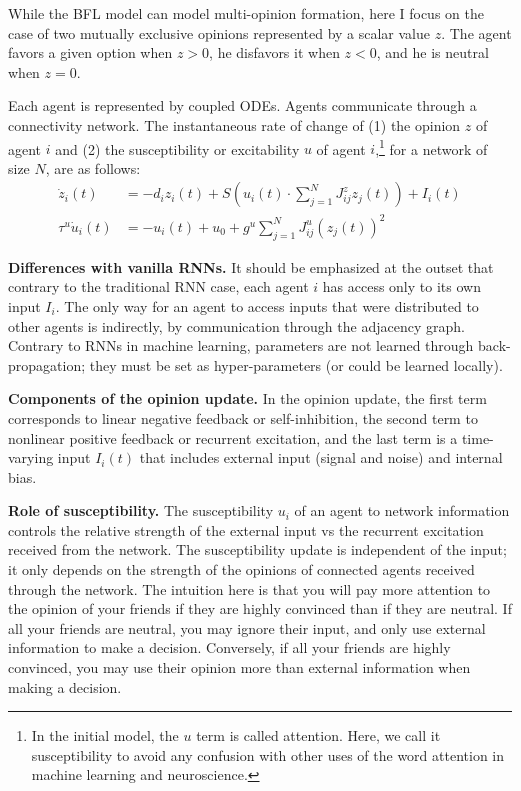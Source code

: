 \documentclass[]{article}
\begin{document}
While the BFL model can model multi-opinion formation, here I focus on the case of two mutually exclusive opinions represented by a scalar value $z$. The agent favors a given option when $z>0$, he disfavors it when $z<0$, and he is neutral when $z = 0$.

Each agent is represented by coupled ODEs. Agents communicate through a connectivity network. The instantaneous rate of change of (1) the opinion $z$ of agent $i$ and (2) the susceptibility or excitability $u$ of agent $i$,\footnote{In the initial model, the $u$ term is called attention. Here, we call it susceptibility to avoid any confusion with other uses of the word attention in machine learning and neuroscience.} for a network of size $N$, are as follows:
\begin{align}
	\dot{z}_{i}(t) &= -d_{i}z_{i}(t) + S \left( u_i(t) \cdot  \sum^{N}_{j=1} J^z_{ij}z_{j}(t)  \right) + I_{i}(t) \\
	\tau^u \dot{u}_i(t) &= -u_i(t)+u_0+g^u \sum ^{N}_{j=1} J^u_{ij}(z_{j}(t))^2
\end{align}

\textbf{Differences with vanilla RNNs.} It should be emphasized at the outset that contrary to the traditional RNN case, each agent $i$ has access only to its own input $I_i$. The only way for an agent to access inputs that were distributed to other agents is indirectly, by communication through the adjacency graph. Contrary to RNNs in machine learning, parameters are not learned through back-propagation; they must be set as hyper-parameters (or could be learned locally). 

\textbf{Components of the opinion update.} In the opinion update, the first term corresponds to linear negative feedback or self-inhibition, the second term to nonlinear positive feedback or recurrent excitation, and the last term is a time-varying input $I_i(t)$ that includes external input (signal and noise) and internal bias.

\textbf{Role of susceptibility.} The susceptibility $u_i$ of an agent to network information controls the relative strength of the external input vs the recurrent excitation received from the network. The susceptibility update is independent of the input; it only depends on the strength of the opinions of connected agents received through the network. The intuition here is that you will pay more attention to the opinion of your friends if they are highly convinced than if they are neutral. If all your friends are neutral, you may ignore their input, and only use external information to make a decision. Conversely, if all your friends are highly convinced, you may use their opinion more than external information when making a decision.
\end{document}

